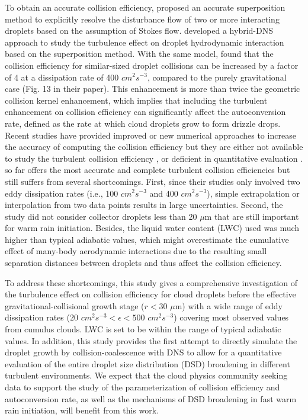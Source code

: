 To obtain an accurate collision efficiency, \citet{Wang2005a,Wang2005b} proposed an accurate superposition method to explicitly resolve the disturbance flow of two or more interacting droplets based on the assumption of Stokes flow. \citet{Ayala2007} developed a hybrid-DNS approach to study the turbulence effect on droplet hydrodynamic interaction based on the superposition method. With the same model, \citet{Wang2008} found that the collision efficiency for similar-sized droplet collisions can be increased by a factor of 4 at a dissipation rate of 400 $cm^2s^{-3}$, compared to the purely gravitational case (Fig. 13 in their paper). This enhancement is more than twice the geometric collision kernel enhancement, which implies that including the turbulent enhancement on collision efficiency can significantly affect the autoconversion rate, defined as the rate at which cloud droplets grow to form drizzle drops. Recent studies have provided improved or new numerical approaches to increase the accuracy of computing the collision efficiency but they are either not available to study the turbulent collision efficiency \citep{Rosa2011}, or deficient in quantitative evaluation \citep[e.g.,][]{Onishi2013, Ayala2014}. \citet{Wang2008} so far offers the most accurate and complete turbulent collision efficiencies but still suffers from several shortcomings. First, since their studies only involved two eddy dissipation rates (i.e., 100 $cm^2s^{-3}$ and 400 $cm^2s^{-3}$), simple extrapolation or interpolation from two data points results in large uncertainties. Second, the study did not consider collector droplets less than 20 $\mu$m that are still important for warm rain initiation. Besides, the liquid water content (LWC) used was much higher than typical adiabatic values, which might overestimate the cumulative effect of many-body aerodynamic interactions due to the resulting small separation distances between droplets and thus affect the collision efficiency. 

To address these shortcomings, this study gives a comprehensive investigation of the turbulence effect on collision efficiency for cloud droplets before the effective gravitational-collisional growth stage ($r < 30 $ $\mu$m) with a wide range of eddy dissipation rates ($20$ $cm^2s^{-3}<\epsilon<500$ $cm^2s^{-3}$) covering most observed values from cumulus clouds. LWC is set to be within the range of typical adiabatic values. In addition, this study provides the first attempt to directly simulate the droplet growth by collision-coalescence with DNS to allow for a quantitative evaluation of the entire droplet size distribution (DSD) broadening in different turbulent environments. We expect that the cloud physics community seeking data to support the study of the parameterization of collision efficiency and autoconversion rate, as well as the mechanisms of DSD broadening in fast warm rain initiation, will benefit from this work.

